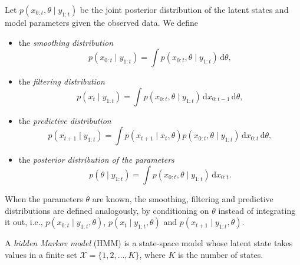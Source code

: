 \begin{definition}
    \label{def:distributions_of_interest}
    Let $p(x_{0:t}, \theta \mid y_{1:t})$ be the joint posterior distribution of the latent states and model parameters given the observed data. We define
    \begin{itemize}
        \item the \emph{smoothing distribution}
        \begin{equation}
            \label{eq:smoothing_distribution}
            p(x_{0:t} \mid y_{1:t}) = \int p(x_{0:t}, \theta \mid y_{1:t})\,\mathrm{d}\theta,
        \end{equation}
        \item the \emph{filtering distribution}
        \begin{equation}
            \label{eq:filtering_distribution}
            p(x_t \mid y_{1:t}) = \int p(x_{0:t}, \theta \mid y_{1:t})\,\mathrm{d}x_{0:t-1}\,\mathrm{d}\theta,
        \end{equation}
        \item the \emph{predictive distribution}
        \begin{equation}
            \label{eq:predictive_distribution}
            p(x_{t+1} \mid y_{1:t}) = \int p(x_{t+1} \mid x_t, \theta) p(x_{0:t}, \theta \mid y_{1:t})\,\mathrm{d}x_{0:t}\,\mathrm{d}\theta,
        \end{equation}
        \item the \emph{posterior distribution of the parameters}
        \begin{equation}
            \label{eq:posterior_distribution_parameters}
            p(\theta \mid y_{1:t}) = \int p(x_{0:t}, \theta \mid y_{1:t})\,\mathrm{d}x_{0:t}.
        \end{equation}
    \end{itemize}
\end{definition}

When the parameters $\theta$ are known, the smoothing, filtering and predictive distributions are defined analogously, by conditioning on $\theta$ instead of integrating it out, i.e., $p(x_{0:t} \mid y_{1:t}, \theta)$, $p(x_t \mid y_{1:t}, \theta)$ and $p(x_{t+1} \mid y_{1:t}, \theta)$.

\begin{definition}
    A \emph{hidden Markov model} (HMM) is a state-space model whose latent state takes values in a finite set $\mathcal{X} = \{1, 2, \ldots, K\}$, where $K$ is the number of states.
\end{definition}

